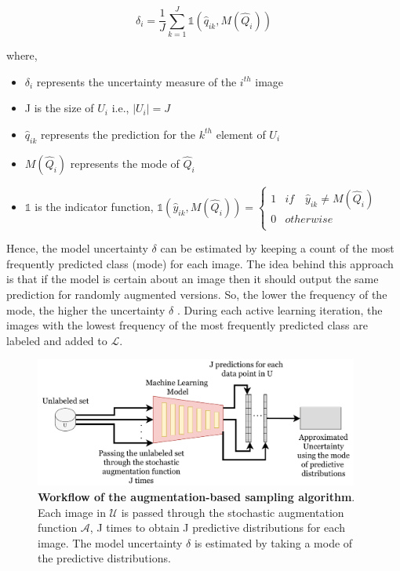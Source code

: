 \begin{equation}
    \label{equation:augmentation_based_sampling}
    \delta_{i} = \frac{1}{J} \sum_{k=1}^{J} \mathbb{1}(\hat{q}_{ik}, M(\hat{Q}_i))
\end{equation}

where,
\begin{itemize}[label={}]
  \setlength\itemsep{0em}
  \item $\delta_{i}$ represents the uncertainty measure of the $i^{th}$ image
  \item J is the size of $U_i$ i.e., $|U_i| = J$
  \item $\hat{q}_{ik}$ represents the prediction for the $k^{th}$ element of $U_i$
  \item $M(\hat{Q}_i)$ represents the mode of $\hat{Q}_i$
  \item $\mathbb{1}$ is the indicator function, $\mathbb{1}(\hat{y}_{ik}, M(\hat{Q}_i)) = \begin{cases} 
      1 & if \quad \hat{y}_{ik} \neq M(\hat{Q}_i) \\
      0 & otherwise \\
   \end{cases}$
\end{itemize}

Hence, the model uncertainty $\delta$ can be estimated by keeping a count of the most frequently predicted class (mode) for each image. The idea behind this approach is that if the model is certain about an image then it should output the same prediction for randomly augmented versions. So, the lower the frequency of the mode, the higher the uncertainty $\delta$ \cite{sadafi2019}. During each active learning iteration, the images with  the lowest frequency of the most frequently predicted class are labeled and added to $\mathcal{L}$.

\begin{figure}[htbp]
\centering
\captionsetup{format=plain}
\includegraphics[keepaspectratio,width=0.95\textwidth]{figures/fig_augmentations_based.pdf}
\caption[Workflow of the augmentation-based sampling algorithm]{\textbf{Workflow of the augmentation-based sampling algorithm}. Each image in $\mathcal{U}$ is passed through the stochastic augmentation function $\mathcal{A}$, J times to obtain J predictive distributions for each image. The model uncertainty $\delta$ is estimated by taking a mode of the predictive distributions.}
\label{fig:augmentations_based}
\end{figure}

